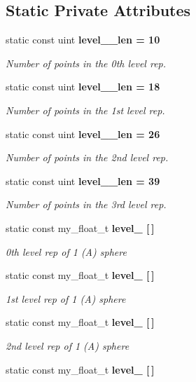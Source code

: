 \subsection*{Static Private Attributes}
\begin{CompactItemize}
\item 
static const uint \bf{level\_\_\-len} = 10\label{classSimSite3D_1_1DiscreteSphere_272db3a33db89cfda38c0a2f7e488bca}

\begin{CompactList}\small\item\em Number of points in the 0th level rep. \item\end{CompactList}\item 
static const uint \bf{level\_\_\-len} = 18\label{classSimSite3D_1_1DiscreteSphere_f067998b14bfba388d2f803330d6792c}

\begin{CompactList}\small\item\em Number of points in the 1st level rep. \item\end{CompactList}\item 
static const uint \bf{level\_\_\-len} = 26\label{classSimSite3D_1_1DiscreteSphere_59d0d77b116b29ec295f48add6fec024}

\begin{CompactList}\small\item\em Number of points in the 2nd level rep. \item\end{CompactList}\item 
static const uint \bf{level\_\_\-len} = 39\label{classSimSite3D_1_1DiscreteSphere_066b8e66f73f541fb02b82ed853a3aed}

\begin{CompactList}\small\item\em Number of points in the 3rd level rep. \item\end{CompactList}\item 
static const my\_\-float\_\-t \bf{level\_} [$\,$]
\begin{CompactList}\small\item\em 0th level rep of 1 (A) sphere \item\end{CompactList}\item 
static const my\_\-float\_\-t \bf{level\_} [$\,$]
\begin{CompactList}\small\item\em 1st level rep of 1 (A) sphere \item\end{CompactList}\item 
static const my\_\-float\_\-t \bf{level\_} [$\,$]
\begin{CompactList}\small\item\em 2nd level rep of 1 (A) sphere \item\end{CompactList}\item 
static const my\_\-float\_\-t \bf{level\_} [$\,$]\label{classSimSite3D_1_1DiscreteSphere_a074b8dd69e55ae9ac9020e3d5a56a7d}


\end{CompactItemize}

